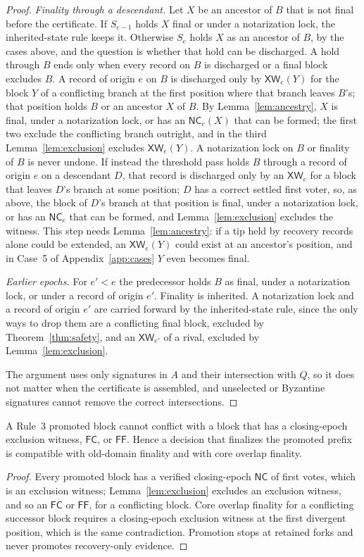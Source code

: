 \documentclass[conference]{IEEEtran}
\newcommand{\NC}{\mathsf{NC}}
\newcommand{\XW}{\mathsf{XW}}
\newcommand{\FC}{\mathsf{FC}}
\newcommand{\FF}{\mathsf{FF}}
\begin{document}
\begin{proof}
\emph{Finality through a descendant.} Let $X$ be an ancestor of $B$ that is not final before the certificate. If $S_{e-1}$ holds $X$ final or under a notarization lock, the inherited-state rule keeps it. Otherwise $S_e$ holds $X$ as an ancestor of $B$, by the cases above, and the question is whether that hold can be discharged. A hold through $B$ ends only when every record on $B$ is discharged or a final block excludes $B$. A record of origin $e$ on $B$ is discharged only by $\XW_e(Y)$ for the block $Y$ of a conflicting branch at the first position where that branch leaves $B$'s; that position holds $B$ or an ancestor $X$ of $B$. By Lemma~\ref{lem:ancestry}, $X$ is final, under a notarization lock, or has an $\NC_e(X)$ that can be formed; the first two exclude the conflicting branch outright, and in the third Lemma~\ref{lem:exclusion} excludes $\XW_e(Y)$. A notarization lock on $B$ or finality of $B$ is never undone. If instead the threshold pass holds $B$ through a record of origin $e$ on a descendant $D$, that record is discharged only by an $\XW_e$ for a block that leaves $D$'s branch at some position; $D$ has a correct settled first voter, so, as above, the block of $D$'s branch at that position is final, under a notarization lock, or has an $\NC_e$ that can be formed, and Lemma~\ref{lem:exclusion} excludes the witness. This step needs Lemma~\ref{lem:ancestry}: if a tip held by recovery records alone could be extended, an $\XW_e(Y)$ could exist at an ancestor's position, and in Case~5 of Appendix~\ref{app:cases} $Y$ even becomes final.

\emph{Earlier epochs.} For $e'<e$ the predecessor holds $B$ as final, under a notarization lock, or under a record of origin $e'$. Finality is inherited. A notarization lock and a record of origin $e'$ are carried forward by the inherited-state rule, since the only ways to drop them are a conflicting final block, excluded by Theorem~\ref{thm:safety}, and an $\XW_{e'}$ of a rival, excluded by Lemma~\ref{lem:exclusion}.

The argument uses only signatures in $A$ and their intersection with $Q$, so it does not matter when the certificate is assembled, and unselected or Byzantine signatures cannot remove the correct intersections.
\end{proof}

\begin{lemma}
\label{lem:promotion}
A Rule~3 promoted block cannot conflict with a block that has a closing-epoch exclusion witness, $\FC$, or $\FF$. Hence a decision that finalizes the promoted prefix is compatible with old-domain finality and with core overlap finality.
\end{lemma}
\begin{proof}
Every promoted block has a verified closing-epoch $\NC$ of first votes, which is an exclusion witness; Lemma~\ref{lem:exclusion} excludes an exclusion witness, and so an $\FC$ or $\FF$, for a conflicting block. Core overlap finality for a conflicting successor block requires a closing-epoch exclusion witness at the first divergent position, which is the same contradiction. Promotion stops at retained forks and never promotes recovery-only evidence.
\end{proof}
\end{document}
